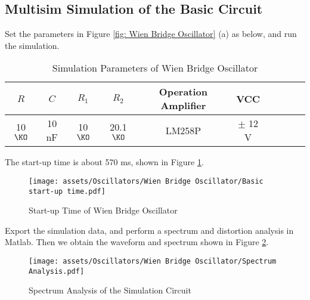 \documentclass[D:/a_RemoteRepo/GH.LatexNotes/.demo/Analog_Circuits_Handbook.tex]{subfiles}
\begin{document}
\subsection{Multisim Simulation of the Basic Circuit}
Set the parameters in Figure \ref{fig: Wien Bridge Oscillator} (a) as below, and run the simulation. 
\begin{table}[H]\centering
    \caption{Simulation Parameters of Wien Bridge Oscillator}
    \label{tab: Simulation Parameters of Wien Bridge Oscillator}
\begin{tabular}{cccccccccc}\toprule
    $R$ & $C$ & $R_1$ & $R_2$ & Operation Amplifier & VCC \\
    \midrule
    10 $\KO$ & 10 nF & 10 $\KO$ & 20.1 $\KO$ & LM258P & $\pm$ 12 V \\
    \bottomrule
\end{tabular}
\end{table}
The start-up time is about 570 ms, shown in Figure \ref{fig: Start-up Time of Wien Bridge Oscillator}.
\begin{figure}[H]\centering
    \texttt{[image: assets/Oscillators/Wien Bridge Oscillator/Basic start-up time.pdf]}
    \caption{Start-up Time of Wien Bridge Oscillator}
    \label{fig: Start-up Time of Wien Bridge Oscillator}
\end{figure}

Export the simulation data, and perform a spectrum and distortion analysis in Matlab. Then we obtain the waveform and spectrum shown in Figure \ref{fig: Spectrum Analysis of the Simulation Circuit}.
\begin{figure}[H]\centering
    \texttt{[image: assets/Oscillators/Wien Bridge Oscillator/Spectrum Analysis.pdf]}
    \caption{Spectrum Analysis of the Simulation Circuit}
    \label{fig: Spectrum Analysis of the Simulation Circuit}
\end{figure}
\end{document}
